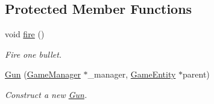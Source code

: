 \subsection*{Protected Member Functions}
\begin{DoxyCompactItemize}
\item 
\mbox{\label{class_gun_ac10cfe0a1a30ada1594d04b85563e558}} 
void \mbox{\hyperlink{class_gun_ac10cfe0a1a30ada1594d04b85563e558}{fire}} ()
\begin{DoxyCompactList}\small\item\em Fire one bullet. \end{DoxyCompactList}\item 
\mbox{\hyperlink{class_gun_a712fed11162d53460659683a9cdac7ba}{Gun}} (\mbox{\hyperlink{class_game_manager}{Game\+Manager}} $\ast$\+\_\+manager, \mbox{\hyperlink{class_game_entity}{Game\+Entity}} $\ast$parent)
\begin{DoxyCompactList}\small\item\em Construct a new \mbox{\hyperlink{class_gun}{Gun}}. \end{DoxyCompactList}\end{DoxyCompactItemize}
